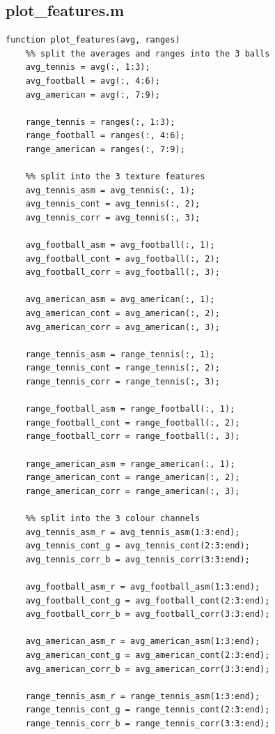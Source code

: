 \documentclass[conference]{IEEEtran}
\begin{document}
        \subsection{plot\_features.m}
            \begin{lstlisting}[style=Matlab-editor, basicstyle=\scriptsize]
function plot_features(avg, ranges)
    %% split the averages and ranges into the 3 balls
    avg_tennis = avg(:, 1:3);
    avg_football = avg(:, 4:6);
    avg_american = avg(:, 7:9);

    range_tennis = ranges(:, 1:3);
    range_football = ranges(:, 4:6);
    range_american = ranges(:, 7:9);

    %% split into the 3 texture features
    avg_tennis_asm = avg_tennis(:, 1);
    avg_tennis_cont = avg_tennis(:, 2);
    avg_tennis_corr = avg_tennis(:, 3);

    avg_football_asm = avg_football(:, 1);
    avg_football_cont = avg_football(:, 2);
    avg_football_corr = avg_football(:, 3);

    avg_american_asm = avg_american(:, 1);
    avg_american_cont = avg_american(:, 2);
    avg_american_corr = avg_american(:, 3);

    range_tennis_asm = range_tennis(:, 1);
    range_tennis_cont = range_tennis(:, 2);
    range_tennis_corr = range_tennis(:, 3);

    range_football_asm = range_football(:, 1);
    range_football_cont = range_football(:, 2);
    range_football_corr = range_football(:, 3);

    range_american_asm = range_american(:, 1);
    range_american_cont = range_american(:, 2);
    range_american_corr = range_american(:, 3);

    %% split into the 3 colour channels
    avg_tennis_asm_r = avg_tennis_asm(1:3:end);
    avg_tennis_cont_g = avg_tennis_cont(2:3:end);
    avg_tennis_corr_b = avg_tennis_corr(3:3:end);

    avg_football_asm_r = avg_football_asm(1:3:end);
    avg_football_cont_g = avg_football_cont(2:3:end);
    avg_football_corr_b = avg_football_corr(3:3:end);

    avg_american_asm_r = avg_american_asm(1:3:end);
    avg_american_cont_g = avg_american_cont(2:3:end);
    avg_american_corr_b = avg_american_corr(3:3:end);

    range_tennis_asm_r = range_tennis_asm(1:3:end);
    range_tennis_cont_g = range_tennis_cont(2:3:end);
    range_tennis_corr_b = range_tennis_corr(3:3:end);


\end{lstlisting}
\end{document}
